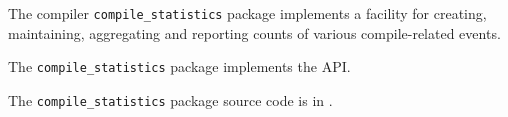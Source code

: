 
The compiler {\tt compile\_statistics} package implements a facility 
for creating, maintaining, aggregating and reporting counts of various compile-related 
events.

The {\tt compile\_statistics} package implements the  API.

The {\tt compile\_statistics} package source code is in .



